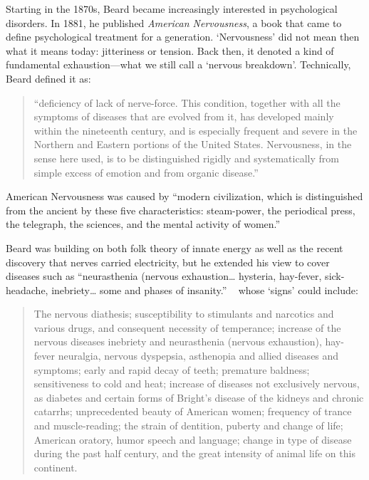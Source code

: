 Starting in the 1870s, Beard became increasingly interested in psychological disorders. In 1881, he published \emph{American Nervousness}, a book that came to define psychological treatment for a generation. `Nervousness' did not mean then what it means today: jitteriness or tension. Back then, it denoted a kind of fundamental exhaustion---what we still call a `nervous breakdown'. Technically, Beard defined it as:

\begin{quote}

``deficiency of lack of nerve-force. This condition, together with all the symptoms of diseases that are evolved from it, has developed mainly within the nineteenth century, and is especially frequent and severe in the Northern and Eastern portions of the United States. Nervousness, in the sense here used, is to be distinguished rigidly and systematically from simple excess of emotion and from organic disease.'' ~\citep[p. vi]{Beard:1881tg}
\end{quote}

American Nervousness was caused by ``modern civilization, which is distinguished from the ancient by these five characteristics: steam-power, the periodical press, the telegraph, the sciences, and the mental activity of women.'' ~\citep[p. vi]{Beard:1881tg}

Beard was building on both folk theory of innate energy as well as the recent discovery that nerves carried electricity, but he extended his view to cover diseases such as ``neurasthenia (nervous exhaustion{\ldots} hysteria, hay-fever, sick-headache, inebriety{\ldots} some and phases of insanity.'' ~\citep[p. vii]{Beard:1881tg} whose `signs' could include:

\begin{quote}

The nervous diathesis; susceptibility to stimulants and narcotics and various drugs, and consequent necessity of temperance; increase of the nervous diseases inebriety and neurasthenia (nervous exhaustion), hay-fever neuralgia, nervous dyspepsia, asthenopia and allied diseases and symptoms; early and rapid decay of teeth; premature baldness; sensitiveness to cold and heat; increase of diseases not exclusively nervous, as diabetes and certain forms of Bright's disease of the kidneys and chronic catarrhs; unprecedented beauty of American women; frequency of trance and muscle-reading; the strain of dentition, puberty and change of life; American oratory, humor speech and language; change in type of disease during the past half century, and the great intensity of animal life on this continent. ~\citep[p. vii-ix]{Beard:1881tg}
\end{quote}

